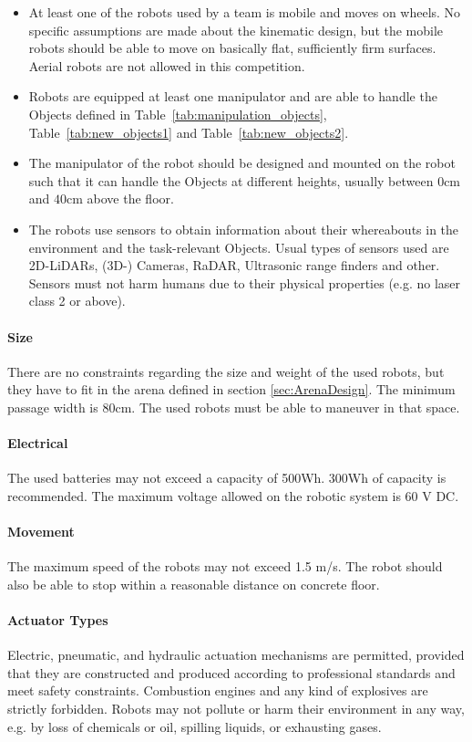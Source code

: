\begin{itemize}
	\item At least one of the robots used by a team is mobile and moves on wheels. No specific assumptions are made about the kinematic design, but the mobile robots should be able to move on basically flat, sufficiently firm surfaces. Aerial robots are not allowed in this competition. 
	\item Robots are equipped at least one manipulator and are able to handle the Objects defined in Table~\ref{tab:manipulation_objects}, Table~\ref{tab:new_objects1} and Table~\ref{tab:new_objects2}.
	\item The manipulator of the robot should be designed and mounted on the robot such that it can handle the Objects at different heights, usually between $0\si{\centi\meter}$ and $40\si{\centi\meter}$ above the floor.
	\item The robots use sensors to obtain information about their whereabouts in the environment and the task-relevant Objects. 
	Usual types of sensors used are 2D-LiDARs, (3D-) Cameras, RaDAR, Ultrasonic range finders and other. 
	Sensors must not harm humans due to their physical properties (e.g. no laser class 2 or above).

\end{itemize}

\paragraph{Size}
There are no constraints regarding the size and weight of the used robots, but they have to fit in the arena defined in section \ref{sec:ArenaDesign}. The minimum passage width is $80\si{\centi\meter}$. The used robots must be able to maneuver in that space.

\paragraph{Electrical}
The used batteries may not exceed a capacity of 500Wh. 300Wh of capacity is recommended. The maximum voltage allowed on the robotic system is 60 V DC.

\paragraph{Movement}
The maximum speed of the robots may not exceed 1.5 m/s. The robot should also be able to stop within a reasonable distance on concrete floor.

\paragraph{Actuator Types}
Electric, pneumatic, and hydraulic actuation mechanisms are permitted, provided that they are constructed and produced according to professional standards and meet safety constraints. Combustion engines and any kind of explosives are strictly forbidden. Robots may not pollute or harm their environment in any way, e.g. by loss of chemicals or oil, spilling liquids, or exhausting gases.


